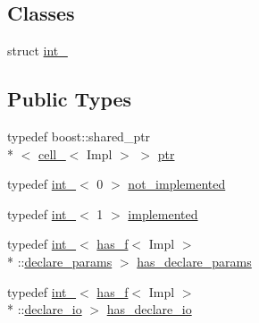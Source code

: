 \subsection*{Classes}
\begin{DoxyCompactItemize}
\item 
struct \hyperlink{structecto_1_1cell___1_1int__}{int\-\_\-}
\end{DoxyCompactItemize}
\subsection*{Public Types}
\begin{DoxyCompactItemize}
\item 
typedef boost\-::shared\-\_\-ptr\\*
$<$ \hyperlink{structecto_1_1cell__}{cell\-\_\-}$<$ Impl $>$ $>$ \hyperlink{structecto_1_1cell___a26d9e255a2ba0335c5e90fd04efa6bfa}{ptr}
\item 
typedef \hyperlink{structecto_1_1cell___1_1int__}{int\-\_\-}$<$ 0 $>$ \hyperlink{structecto_1_1cell___a3e48e52421d132bb2bb4e343f771abeb}{not\-\_\-implemented}
\item 
typedef \hyperlink{structecto_1_1cell___1_1int__}{int\-\_\-}$<$ 1 $>$ \hyperlink{structecto_1_1cell___a63c5c3dd95630a508017730ee345c23a}{implemented}
\item 
typedef \hyperlink{structecto_1_1cell___1_1int__}{int\-\_\-}$<$ \hyperlink{structecto_1_1has__f}{has\-\_\-f}$<$ Impl $>$\\*
\-::\hyperlink{structecto_1_1cell___a6a36edc8e9eddadfe6486460bab93c93}{declare\-\_\-params} $>$ \hyperlink{structecto_1_1cell___ab7b111eb2672ae4eaacc668852b8b89f}{has\-\_\-declare\-\_\-params}
\item 
typedef \hyperlink{structecto_1_1cell___1_1int__}{int\-\_\-}$<$ \hyperlink{structecto_1_1has__f}{has\-\_\-f}$<$ Impl $>$\\*
\-::\hyperlink{structecto_1_1cell___ac08370823fea8ed7f5991e369f6a7fa7}{declare\-\_\-io} $>$ \hyperlink{structecto_1_1cell___a10ab0d3f85e194d548beb3251416a569}{has\-\_\-declare\-\_\-io}
\end{DoxyCompactItemize}
